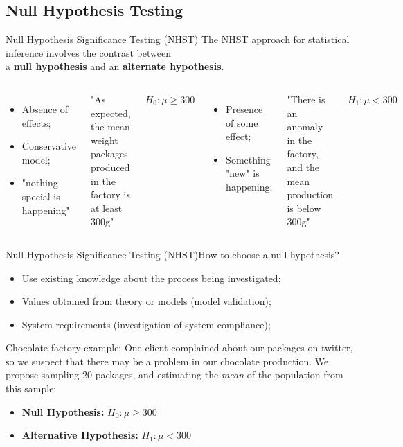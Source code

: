 \subsection{Null Hypothesis Testing}
\begin{frame}{Null Hypothesis Significance Testing (NHST)}
  The NHST approach for statistical inference involves the contrast between\\
  a {\bf null hypothesis} and an {\bf alternate hypothesis}.\bigskip

  \begin{columns}[T]
      \begin{itemize}
        \item Absence of effects;
        \item Conservative model;
        \item "nothing special is happening"
      \end{itemize}
      \bigskip

      "As expected, the mean weight packages produced in the factory is at least 300g"
      \bigskip

      {\bf $H_0: \mu \geq 300$}
      \begin{itemize}
        \item Presence of some effect;
        \item Something "new" is happening;
      \end{itemize}
      \bigskip

      "There is \alert{an anomaly} in the factory, and the mean production is below 300g"
      \bigskip

      {\bf $H_1: \mu < 300$}
  \end{columns}
\end{frame}

\begin{frame}{Null Hypothesis Significance Testing (NHST)}{How to choose a null hypothesis?}
  \begin{itemize}
    \item Use existing knowledge about the process being investigated;
    \item Values obtained from theory or models (model validation);
    \item System requirements (investigation of system compliance);
  \end{itemize}
  \bigskip
  \begin{block}{Chocolate factory example:}
    One client complained about our packages on twitter, so we suspect that there may be a problem in our chocolate production. We propose sampling $20$ packages, and estimating the \emph{mean} of the population from this sample:
    \bigskip
    \begin{itemize}
      \item {\bf Null Hypothesis:} $H_0: \mu \geq 300$
      \item {\bf Alternative Hypothesis:} $H_1: \mu < 300$
    \end{itemize}
  \end{block}
\end{frame}
